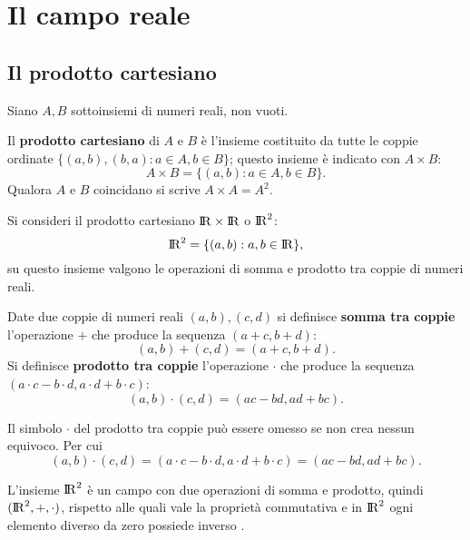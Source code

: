 \chapter{Il campo reale}
\section{Il prodotto cartesiano}
Siano $A,B$ sottoinsiemi di numeri reali, non vuoti.
\begin{defin}{}{}
Il \textbf{prodotto cartesiano} di $A$ e $B$ è l'insieme costituito da tutte le coppie ordinate $\lbrace(a,b),(b,a):a\in A, b\in B\rbrace$; questo insieme è indicato con $A\times B$:
\[
A\times B=\lbrace(a,b): a\in A, b\in B\rbrace.
\]
Qualora $A$ e $B$ coincidano si scrive $A\times A=A^2$.
\end{defin}
Si consideri il prodotto cartesiano ${\rm I\!R}\times {\rm I\!R}$ o ${\rm I\!R}^2$:
\[
{\rm I\!R}^2=\lbrace(a,b): a,b\in{\rm I\!R}\rbrace,
\]
su questo insieme valgono le operazioni di somma e prodotto tra coppie di numeri reali.
\begin{defin}{}{}
Date due coppie di numeri reali $(a,b), (c,d)$ si definisce \textbf{somma tra coppie} l'operazione $+$ che produce la sequenza $(a+c, b+d)$:
\[
(a,b)+(c,d)=(a+c,b+d).
\]
Si definisce \textbf{prodotto tra coppie} l'operazione $\cdot$ che produce la sequenza $(a\cdot c-b\cdot d,a\cdot d+b\cdot c)$:
\[
(a,b)\cdot(c,d)=(ac-bd,ad+bc).
\]
\end{defin}
\begin{remark}
Il simbolo $\cdot$ del prodotto tra coppie può essere omesso se non crea nessun equivoco. Per cui
\[
(a,b)\cdot(c,d)=(a\cdot c-b\cdot d,a\cdot d+b\cdot c)=(ac-bd,ad+bc).
\]
\end{remark}
\begin{remark}
L'insieme ${\rm I\!R}^2$ è un campo con due operazioni di somma e prodotto, quindi $({\rm I\!R}^2, +,\cdot)$, rispetto alle quali vale la proprietà commutativa e in ${\rm I\!R}^2$ ogni elemento diverso da zero possiede inverso .
\end{remark}